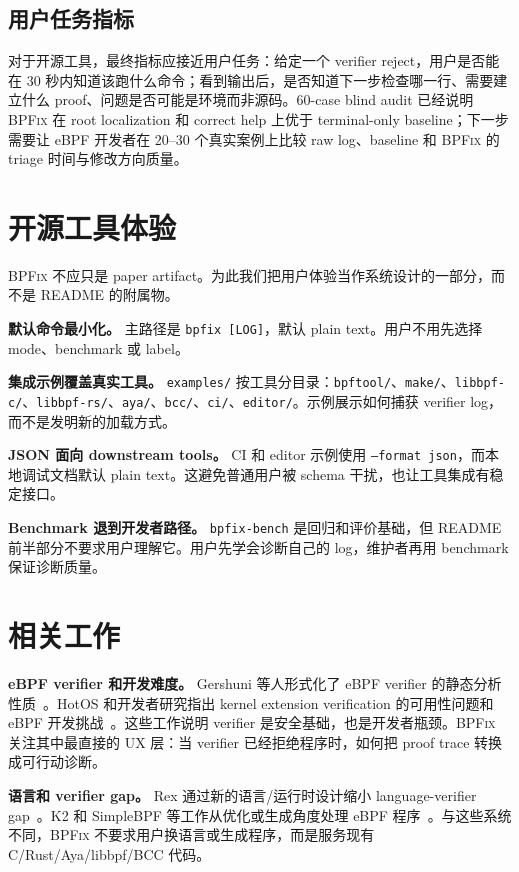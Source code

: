 \documentclass[letterpaper,twocolumn,10pt]{article}
\newcommand{\sys}{\textsc{BPFix}\xspace}
\newcommand{\code}[1]{\texttt{#1}}
\begin{document}
\subsection{用户任务指标}

对于开源工具，最终指标应接近用户任务：给定一个 verifier reject，用户是否能在 30 秒内知道该跑什么命令；看到输出后，是否知道下一步检查哪一行、需要建立什么 proof、问题是否可能是环境而非源码。60-case blind audit 已经说明 \sys 在 root localization 和 correct help 上优于 terminal-only baseline；下一步需要让 eBPF 开发者在 20--30 个真实案例上比较 raw log、baseline 和 \sys 的 triage 时间与修改方向质量。

\section{开源工具体验}

\sys 不应只是 paper artifact。为此我们把用户体验当作系统设计的一部分，而不是 README 的附属物。

\textbf{默认命令最小化。} 主路径是 \code{bpfix [LOG]}，默认 plain text。用户不用先选择 mode、benchmark 或 label。

\textbf{集成示例覆盖真实工具。} \code{examples/} 按工具分目录：\code{bpftool/}、\code{make/}、\code{libbpf-c/}、\code{libbpf-rs/}、\code{aya/}、\code{bcc/}、\code{ci/}、\code{editor/}。示例展示如何捕获 verifier log，而不是发明新的加载方式。

\textbf{JSON 面向 downstream tools。} CI 和 editor 示例使用 \code{--format json}，而本地调试文档默认 plain text。这避免普通用户被 schema 干扰，也让工具集成有稳定接口。

\textbf{Benchmark 退到开发者路径。} \code{bpfix-bench} 是回归和评价基础，但 README 前半部分不要求用户理解它。用户先学会诊断自己的 log，维护者再用 benchmark 保证诊断质量。

\FloatBarrier

\section{相关工作}

\textbf{eBPF verifier 和开发难度。} Gershuni 等人形式化了 eBPF verifier 的静态分析性质~\cite{gershuni2019simple}。HotOS 和开发者研究指出 kernel extension verification 的可用性问题和 eBPF 开发挑战~\cite{hotos2023verif,deokar2024}。这些工作说明 verifier 是安全基础，也是开发者瓶颈。\sys 关注其中最直接的 UX 层：当 verifier 已经拒绝程序时，如何把 proof trace 转换成可行动诊断。

\textbf{语言和 verifier gap。} Rex 通过新的语言/运行时设计缩小 language-verifier gap~\cite{rex2025}。K2 和 SimpleBPF 等工作从优化或生成角度处理 eBPF 程序~\cite{k22023,simplebpf2025}。与这些系统不同，\sys 不要求用户换语言或生成程序，而是服务现有 C/Rust/Aya/libbpf/BCC 代码。
\end{document}
